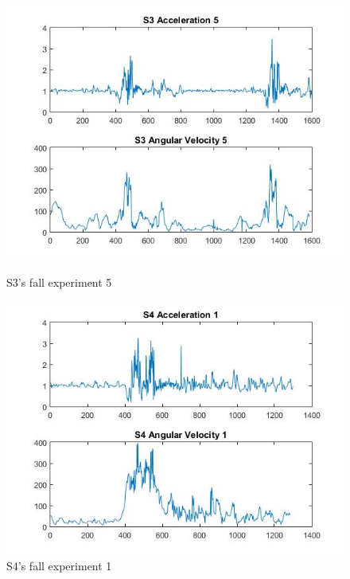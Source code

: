 \documentclass[letterpaper,12pt,titlepage,oneside,final]{book}
\begin{document}
\begin{figure}[h!]
	\centering
	\hspace{-1cm}
	\begin{minipage}[b]{0.5\textwidth}
		\centering
		\includegraphics[scale=0.42]{S3_5}
		\caption{S3's fall experiment 5}
	\end{minipage}%
	\hfill
	\begin{minipage}[b]{0.5\textwidth}
		\centering
		\includegraphics[scale=0.42]{S4_1}
		\caption{S4's fall experiment 1}
	\end{minipage}	
\end{figure}
\end{document}
